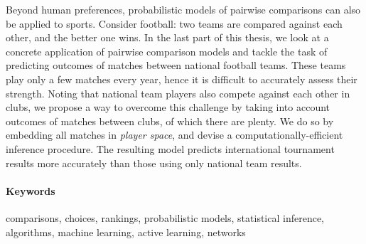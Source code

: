 Beyond human preferences, probabilistic models of pairwise comparisons can also be applied to sports.
Consider football: two teams are compared against each other, and the better one wins.
In the last part of this thesis, we look at a concrete application of pairwise comparison models and tackle the task of predicting outcomes of matches between national football teams.
These teams play only a few matches every year, hence it is difficult to accurately assess their strength.
Noting that national team players also compete against each other in clubs, we propose a way to overcome this challenge by taking into account outcomes of matches between clubs, of which there are plenty.
We do so by embedding all matches in \emph{player space}, and devise a computationally-efficient inference procedure.
The resulting model predicts international tournament results more accurately than those using only national team results.

\paragraph{Keywords}
comparisons, choices, rankings, probabilistic models, statistical inference, algorithms, machine learning, active learning, networks


\cleardoublepage

